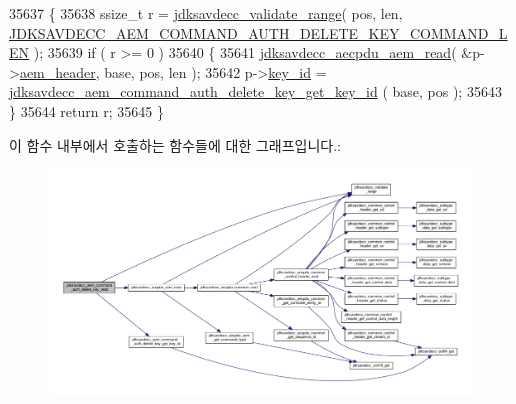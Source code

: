 \begin{DoxyCode}
35637 \{
35638     ssize\_t r = \hyperlink{group__util_ga9c02bdfe76c69163647c3196db7a73a1}{jdksavdecc\_validate\_range}( pos, len, 
      \hyperlink{group__command__auth__delete__key_gac6d4d2fa0239845c45512103ef2efa1c}{JDKSAVDECC\_AEM\_COMMAND\_AUTH\_DELETE\_KEY\_COMMAND\_LEN} );
35639     \textcolor{keywordflow}{if} ( r >= 0 )
35640     \{
35641         \hyperlink{group__aecpdu__aem_gae2421015dcdce745b4f03832e12b4fb6}{jdksavdecc\_aecpdu\_aem\_read}( &p->\hyperlink{structjdksavdecc__aem__command__auth__delete__key_ae1e77ccb75ff5021ad923221eab38294}{aem\_header}, base, pos, len );
35642         p->\hyperlink{structjdksavdecc__aem__command__auth__delete__key_a37cbdf6056556ccfaee3ab01dc7c3032}{key\_id} = \hyperlink{group__command__auth__delete__key_ga1e3fbeba2601084ac4105dec73835133}{jdksavdecc\_aem\_command\_auth\_delete\_key\_get\_key\_id}
      ( base, pos );
35643     \}
35644     \textcolor{keywordflow}{return} r;
35645 \}
\end{DoxyCode}


이 함수 내부에서 호출하는 함수들에 대한 그래프입니다.\+:
\nopagebreak
\begin{figure}[H]
\begin{center}
\leavevmode
\includegraphics[width=350pt]{group__command__auth__delete__key_ga573cc7b5fecd00a5890876ecfc51ed6a_cgraph}
\end{center}
\end{figure}


